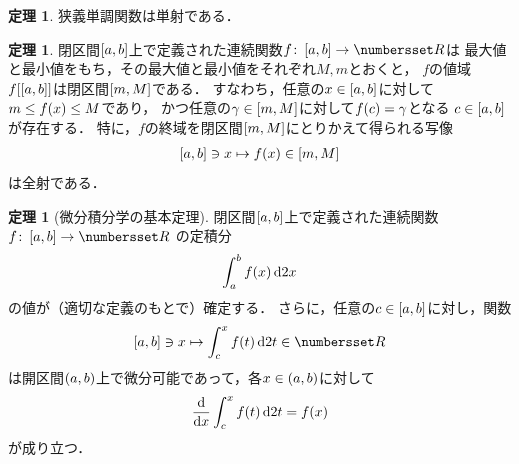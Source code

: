 \documentclass[11pt,a4paper]{ltjsarticle}
\newcommand*{\maparrow}{\rightarrow}
\newcommand*{\intd}{\dl2}
\newcommand*{\image}[2]{#1 \sqbracket*{#2}}
\theoremstyle{definition}
\newtheorem{thm}[dfn]{定理}
\begin{document}
\begin{thm} \label{thm:injection}
  狭義単調関数は単射である．
\end{thm}

\begin{thm} \label{thm:image}
  閉区間$\interval{c}{a,b}$上で定義された連続関数$f \colon \interval{c}{a,b} \maparrow \Real$は
  最大値と最小値をもち，その最大値と最小値をそれぞれ$M,m$とおくと，
  $f$の値域$\image{f}{\interval{c}{a,b}}$は閉区間$\interval{c}{m,M}$である．
  すなわち，任意の$x \in \interval{c}{a,b}$に対して$m \leq \apply{f}{x} \leq M$であり，
  かつ任意の$\gamma \in \interval{c}{m,M}$に対して$\apply{f}{c} = \gamma$となる
  $c \in \interval{c}{a,b}$が存在する．
  特に，$f$の終域を閉区間$\interval{c}{m,M}$にとりかえて得られる写像
  \begin{align}
    \interval{c}{a,b} \ni x \mapsto \apply{f}{x} \in \interval{c}{m,M}
    \label{eq:surjec}
  \end{align}
  は全射である．
\end{thm}

\begin{thm}[微分積分学の基本定理] \label{thm:int}
  閉区間$\interval{c}{a,b}$上で定義された連続関数$f \colon \interval{c}{a,b} \maparrow \Real$
  の定積分
  \begin{align}
    \int_a^b \apply{f}{x} \intd x
    \label{eq:int}
  \end{align}
  の値が（適切な定義のもとで）確定する．
  さらに，任意の$c \in \interval{c}{a,b}$に対し，関数
  \[
    \interval{c}{a,b} \ni x \mapsto \int_c^x \apply{f}{t} \intd t \in \Real
  \]
  は開区間$\interval{op}{a,b}$上で微分可能であって，各$x \in \interval{op}{a,b}$に対して
  \begin{align}
    \diff*{\int_c^x \apply{f}{t} \intd t}x = \apply{f}{x}
    \label{eq:intderi}
  \end{align}
  が成り立つ．
\end{thm}
\end{document}
